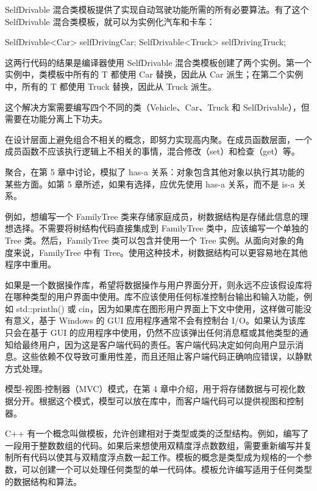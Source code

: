 SelfDrivable 混合类模板提供了实现自动驾驶功能所需的所有必要算法。有了这个 SelfDrivable 混合类模板，就可以为实例化汽车和卡车：

\begin{cpp}
SelfDrivable<Car> selfDrivingCar;
SelfDrivable<Truck> selfDrivingTruck;
\end{cpp}

这两行代码的结果是编译器使用 SelfDrivable 混合类模板创建了两个实例。第一个实例中，类模板中所有的 T 都使用 Car 替换，因此从 Car 派生；在第二个实例中，所有的 T 都使用 Truck 替换，因此从 Truck 派生。

这个解决方案需要编写四个不同的类（Vehicle、Car、Truck 和 SelfDrivable），但需要在功能分离上下功夫。

在设计层面上避免组合不相关的概念，即努力实现高内聚。在成员函数层面，一个成员函数不应该执行逻辑上不相关的事情，混合修改（set）和检查（get）等。


聚合，在第 5 章中讨论，模拟了 has-a 关系：对象包含其他对象以执行其功能的某些方面。如第 5 章所述，如果有选择，应优先使用 has-a 关系，而不是 is-a 关系。

例如，想编写一个 FamilyTree 类来存储家庭成员，树数据结构是存储此信息的理想选择。不需要将树结构代码直接集成到 FamilyTree 类中，应该编写一个单独的 Tree 类。然后，FamilyTree 类可以包含并使用一个 Tree 实例。从面向对象的角度来说，FamilyTree 中有 Tree。使用这种技术，树数据结构可以更容易地在其他程序中重用。


如果是一个数据操作库，希望将数据操作与用户界面分开，则永远不应该假设库将在哪种类型的用户界面中使用。库不应该使用任何标准控制台输出和输入功能，例如 std::println() 或 cin，因为如果库在图形用户界面上下文中使用，这样做可能没有意义，基于 Windows 的 GUI 应用程序通常不会有控制台 I/O。如果认为该库只会在基于 GUI 的应用程序中使用，仍然不应该弹出任何消息框或其他类型的通知给最终用户，因为这是客户端代码的责任。客户端代码决定如何向用户显示消息。这些依赖不仅导致可重用性差，而且还阻止客户端代码正确响应错误，以静默方式处理。

模型-视图-控制器（MVC）模式，在第 4 章中介绍，用于将存储数据与可视化数据分开。根据这个模式，模型可以放在库中，而客户端代码可以提供视图和控制器。


C++ 有一个概念叫做模板，允许创建相对于类型或类的泛型结构。例如，编写了一段用于整数数组的代码。如果后来想使用双精度浮点数数组，需要重新编写并复制所有代码以使其与双精度浮点数一起工作。模板的概念是类型成为规格的一个参数，可以创建一个可以处理任何类型的单一代码体。模板允许编写适用于任何类型的数据结构和算法。

